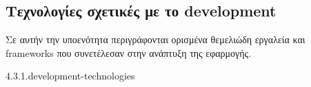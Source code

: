 \subsection{Τεχνολογίες σχετικές με το development}

Σε αυτήν την υποενότητα περιγράφονται ορισμένα θεμελιώδη εργαλεία και frameworks που συνετέλεσαν στην ανάπτυξη της εφαρμογής.

4.3.1.development-technologies

